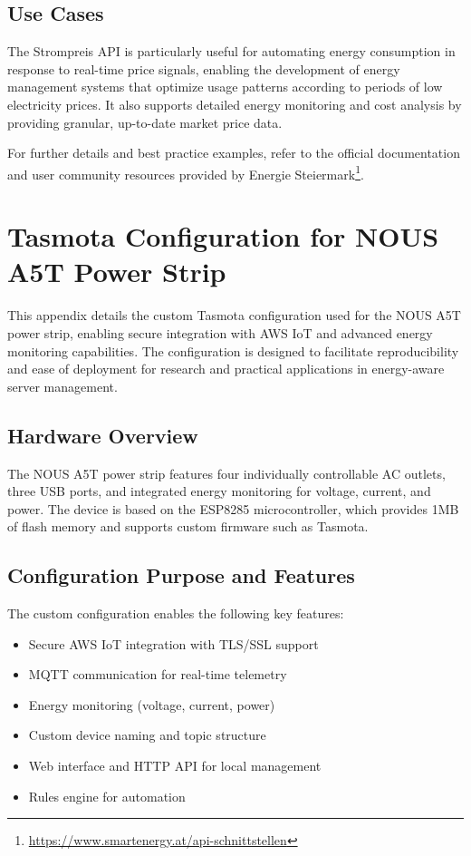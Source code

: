 \subsection{Use Cases}
The Strompreis API is particularly useful for automating energy consumption in response to real-time price signals, enabling the development of energy management systems that optimize usage patterns according to periods of low electricity prices. It also supports detailed energy monitoring and cost analysis by providing granular, up-to-date market price data.

For further details and best practice examples, refer to the official documentation and user community resources provided by Energie Steiermark\footnote{\url{https://www.smartenergy.at/api-schnittstellen}}.

\newpage
\section{Tasmota Configuration for NOUS A5T Power Strip}
\label{appendix:tasmota-config}

This appendix details the custom Tasmota configuration used for the NOUS A5T power strip, enabling secure integration with AWS IoT and advanced energy monitoring capabilities. The configuration is designed to facilitate reproducibility and ease of deployment for research and practical applications in energy-aware server management.

\subsection{Hardware Overview}
The NOUS A5T power strip features four individually controllable AC outlets, three USB ports, and integrated energy monitoring for voltage, current, and power. The device is based on the ESP8285 microcontroller, which provides 1MB of flash memory and supports custom firmware such as Tasmota.

\subsection{Configuration Purpose and Features}
The custom configuration enables the following key features:
\begin{itemize}
    \item Secure AWS IoT integration with TLS/SSL support
    \item MQTT communication for real-time telemetry
    \item Energy monitoring (voltage, current, power)
    \item Custom device naming and topic structure
    \item Web interface and HTTP API for local management
    \item Rules engine for automation
\end{itemize}

